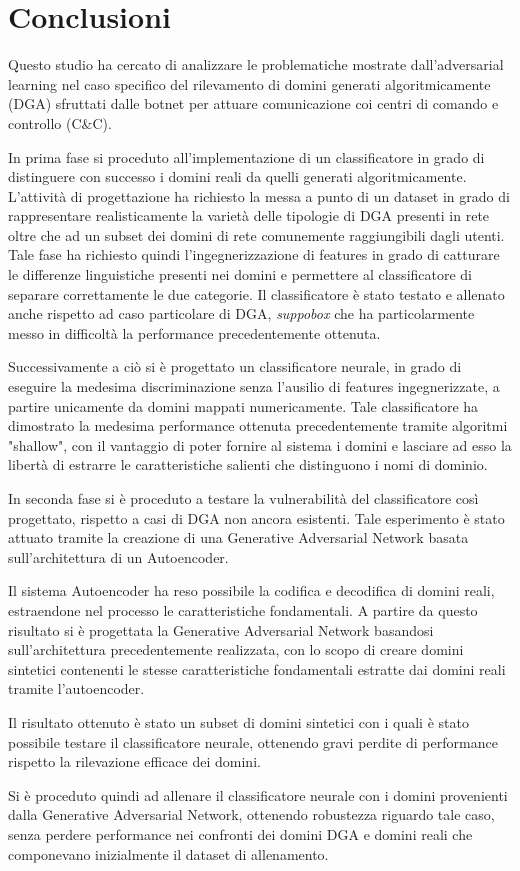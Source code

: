 \chapter{Conclusioni}
\label{conclusioni}
Questo studio ha cercato di analizzare le problematiche mostrate dall'adversarial learning nel caso specifico del rilevamento di domini generati algoritmicamente (DGA) sfruttati dalle botnet per attuare comunicazione coi centri di comando e controllo (C\&C). 

In prima fase si proceduto all'implementazione di un classificatore in grado di distinguere con successo i domini reali da quelli generati algoritmicamente. L'attività di progettazione ha richiesto la messa a punto di un dataset in grado di rappresentare realisticamente la varietà delle tipologie di DGA presenti in rete oltre che ad un subset dei domini di rete comunemente raggiungibili dagli utenti. Tale fase ha richiesto quindi l'ingegnerizzazione di features in grado di catturare le differenze linguistiche presenti nei domini e permettere al classificatore di separare correttamente le due categorie.
Il classificatore è stato testato e allenato anche rispetto ad caso particolare di DGA, \textit{suppobox} che ha particolarmente messo in difficoltà la performance precedentemente ottenuta.

Successivamente a ciò si è progettato un classificatore neurale, in grado di eseguire la medesima discriminazione senza l'ausilio di features ingegnerizzate, a partire unicamente da domini mappati numericamente. Tale classificatore ha dimostrato la medesima performance ottenuta precedentemente tramite algoritmi "shallow", con il vantaggio di poter fornire al sistema i domini e lasciare ad esso la libertà di estrarre le caratteristiche salienti che distinguono i nomi di dominio.

In seconda fase si è proceduto a testare la vulnerabilità del classificatore così progettato, rispetto a casi di DGA non ancora esistenti. Tale esperimento è stato attuato tramite la creazione di una Generative Adversarial Network basata sull'architettura di un Autoencoder. 

Il sistema Autoencoder ha reso possibile la codifica e decodifica di domini reali, estraendone nel processo le caratteristiche fondamentali. A partire da questo risultato si è progettata la Generative Adversarial Network basandosi sull'architettura precedentemente realizzata, con lo scopo di creare domini sintetici contenenti le stesse caratteristiche fondamentali estratte dai domini reali tramite l'autoencoder.

Il risultato ottenuto è stato un subset di domini sintetici con i quali è stato possibile testare il classificatore neurale, ottenendo gravi perdite di performance rispetto la rilevazione efficace dei domini.

Si è proceduto quindi ad allenare il classificatore neurale con i  domini provenienti dalla Generative Adversarial Network, ottenendo robustezza riguardo tale caso, senza perdere performance nei confronti dei domini DGA e domini reali che componevano inizialmente il dataset di allenamento.